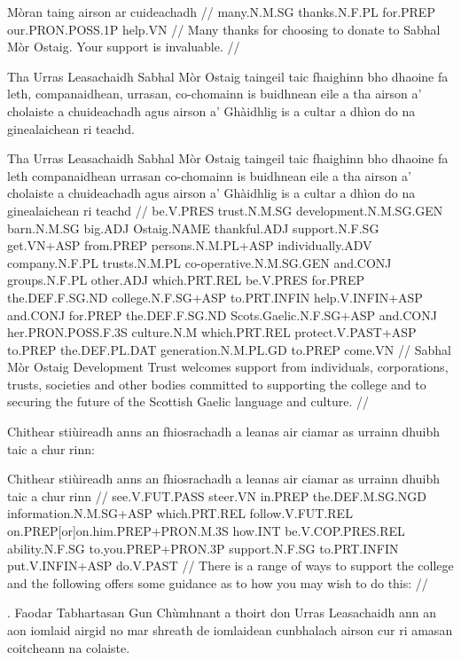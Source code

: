 \documentclass[a4paper,10pt]{article}
\begin{document}
\vspace{4mm}
\gla Mòran taing airson ar cuideachadh  //
\glb many.N.M.SG thanks.N.F.PL for.PREP our.PRON.POSS.1P help.VN  //
\glft Many thanks for choosing to donate to Sabhal Mòr Ostaig. Your support is invaluable. //
\endgl
\xe

\ex
\begingl
\glpre Tha Urras Leasachaidh Sabhal Mòr Ostaig taingeil taic fhaighinn bho dhaoine fa leth, companaidhean, urrasan, co-chomainn is buidhnean eile a tha airson a' cholaiste a chuideachadh agus airson a' Ghàidhlig is a cultar a dhìon do na ginealaichean ri teachd. 

\vspace{4mm}
\gla Tha Urras Leasachaidh Sabhal Mòr Ostaig taingeil taic fhaighinn bho dhaoine {fa leth} companaidhean urrasan co-chomainn is buidhnean eile a tha airson a' cholaiste a chuideachadh agus airson a' Ghàidhlig is a cultar a dhìon do na ginealaichean ri teachd  //
\glb be.V.PRES trust.N.M.SG development.N.M.SG.GEN barn.N.M.SG big.ADJ Ostaig.NAME thankful.ADJ support.N.F.SG get.VN+ASP from.PREP persons.N.M.PL+ASP individually.ADV company.N.F.PL trusts.N.M.PL co-operative.N.M.SG.GEN and.CONJ groups.N.F.PL other.ADJ which.PRT.REL be.V.PRES for.PREP the.DEF.F.SG.ND college.N.F.SG+ASP to.PRT.INFIN help.V.INFIN+ASP and.CONJ for.PREP the.DEF.F.SG.ND Scots.Gaelic.N.F.SG+ASP and.CONJ her.PRON.POSS.F.3S culture.N.M which.PRT.REL protect.V.PAST+ASP to.PREP the.DEF.PL.DAT generation.N.M.PL.GD to.PREP come.VN  //
\glft Sabhal Mòr Ostaig Development Trust welcomes support from individuals, corporations, trusts, societies and other bodies committed to supporting the college and to securing the future of the Scottish Gaelic language and culture. //
\endgl
\xe

\ex
\begingl
\glpre Chithear stiùireadh anns an fhiosrachadh a leanas air ciamar as urrainn dhuibh taic a chur rinn: 

\vspace{4mm}
\gla Chithear stiùireadh anns an fhiosrachadh a leanas air ciamar as urrainn dhuibh taic a chur rinn  //
\glb see.V.FUT.PASS steer.VN in.PREP the.DEF.M.SG.NGD information.N.M.SG+ASP which.PRT.REL follow.V.FUT.REL on.PREP[or]on.him.PREP+PRON.M.3S how.INT be.V.COP.PRES.REL ability.N.F.SG to.you.PREP+PRON.3P support.N.F.SG to.PRT.INFIN put.V.INFIN+ASP do.V.PAST  //
\glft There is a range of ways to support the college and the following offers some guidance as to how you may wish to do this: //
\endgl
\xe

\ex
\begingl
{}. Faodar Tabhartasan Gun Chùmhnant a thoirt don Urras Leasachaidh ann an aon iomlaid airgid no mar shreath de iomlaidean cunbhalach airson cur ri amasan coitcheann na colaiste. 
\end{document}
